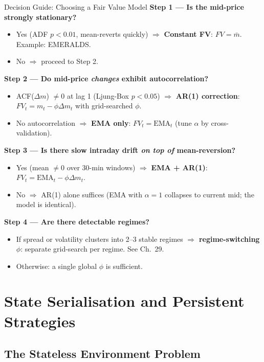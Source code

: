 \documentclass[12pt,a4paper,openany]{report}
\theoremstyle{definition}
\begin{document}
\begin{keyconceptbox}{Decision Guide: Choosing a Fair Value Model}
\textbf{Step 1 — Is the mid-price strongly stationary?}
\begin{itemize}
  \item Yes (ADF $p < 0.01$, mean-reverts quickly) $\Rightarrow$ \textbf{Constant FV}: $FV = \bar{m}$. Example: EMERALDS.
  \item No $\Rightarrow$ proceed to Step 2.
\end{itemize}
\textbf{Step 2 — Do mid-price \emph{changes} exhibit autocorrelation?}
\begin{itemize}
  \item ACF($\Delta m$) $\neq 0$ at lag 1 (Ljung-Box $p < 0.05$) $\Rightarrow$ \textbf{AR(1) correction}: $FV_t = m_t - \phi\Delta m_t$ with grid-searched $\phi$.
  \item No autocorrelation $\Rightarrow$ \textbf{EMA only}: $FV_t = \text{EMA}_t$ (tune $\alpha$ by cross-validation).
\end{itemize}
\textbf{Step 3 — Is there slow intraday drift \emph{on top of} mean-reversion?}
\begin{itemize}
  \item Yes (mean $\neq 0$ over 30-min windows) $\Rightarrow$ \textbf{EMA + AR(1)}: $FV_t = \text{EMA}_t - \phi\Delta m_t$.
  \item No $\Rightarrow$ AR(1) alone suffices (EMA with $\alpha=1$ collapses to current mid; the model is identical).
\end{itemize}
\textbf{Step 4 — Are there detectable regimes?}
\begin{itemize}
  \item If spread or volatility clusters into 2--3 stable regimes $\Rightarrow$ \textbf{regime-switching $\phi$}: separate grid-search per regime. See Ch.~29.
  \item Otherwise: a single global $\phi$ is sufficient.
\end{itemize}
\end{keyconceptbox}


\chapter{State Serialisation and Persistent Strategies}

\section{The Stateless Environment Problem}
\end{document}
